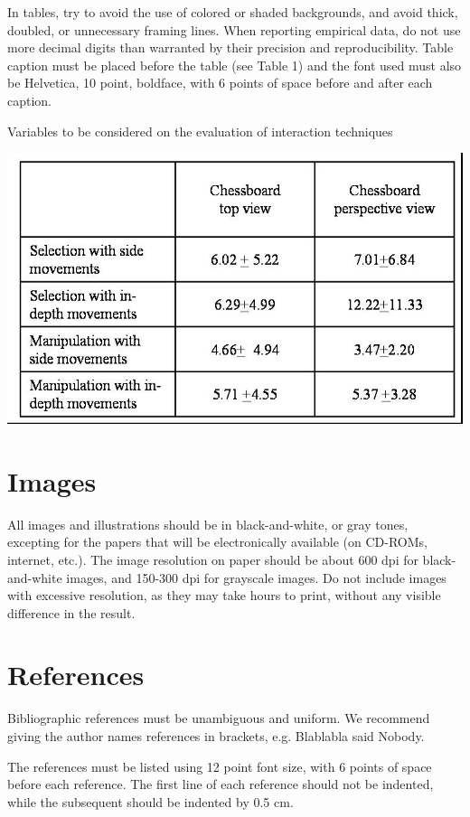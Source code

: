 \documentclass[12pt]{article}
\begin{document}
In tables, try to avoid the use of colored or shaded backgrounds, and avoid
thick, doubled, or unnecessary framing lines. When reporting empirical data,
do not use more decimal digits than warranted by their precision and
reproducibility. Table caption must be placed before the table (see Table 1)
and the font used must also be Helvetica, 10 point, boldface, with 6 points of
space before and after each caption.

\begin{table}[ht]
\centering
\caption{Variables to be considered on the evaluation of interaction
  techniques}
\label{tab:exTable1}
\includegraphics[width=.7\textwidth]{table.jpg}
\end{table}

\section{Images}

All images and illustrations should be in black-and-white, or gray tones,
excepting for the papers that will be electronically available (on CD-ROMs,
internet, etc.). The image resolution on paper should be about 600 dpi for
black-and-white images, and 150-300 dpi for grayscale images.  Do not include
images with excessive resolution, as they may take hours to print, without any
visible difference in the result. 

\section{References}

Bibliographic references must be unambiguous and uniform.  We recommend giving
the author names references in brackets, e.g. Blablabla said Nobody.

The references must be listed using 12 point font size, with 6 points of space
before each reference. The first line of each reference should not be
indented, while the subsequent should be indented by 0.5 cm.



\end{document}
